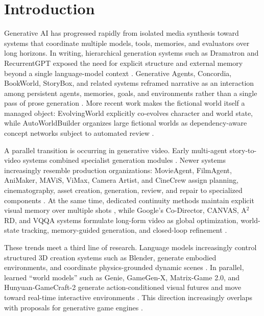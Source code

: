 \documentclass{article}
\begin{document}
\section{Introduction}

Generative AI has progressed rapidly from isolated media synthesis toward systems that coordinate multiple models, tools, memories, and evaluators over long horizons. In writing, hierarchical generation systems such as Dramatron and RecurrentGPT exposed the need for explicit structure and external memory beyond a single language-model context \citep{mirowski2022dramatron,zhou2023recurrentgpt}. Generative Agents, Concordia, BookWorld, StoryBox, and related systems reframed narrative as an interaction among persistent agents, memories, goals, and environments rather than a single pass of prose generation \citep{park2023generativeagents,vezhnevets2023concordia,ran2025bookworld,chen2026storybox}. More recent work makes the fictional world itself a managed object: EvolvingWorld explicitly co-evolves character and world state, while AutoWorldBuilder organizes large fictional worlds as dependency-aware concept networks subject to automated review \citep{zong2026evolvingworld,chen2026worldbuilding}.

A parallel transition is occurring in generative video. Early multi-agent story-to-video systems combined specialist generation modules \citep{wang2024aesopagent,yuan2024mora,hu2024storyagent}. Newer systems increasingly resemble production organizations: MovieAgent, FilmAgent, AniMaker, MAViS, ViMax, Camera Artist, and CineCrew assign planning, cinematography, asset creation, generation, review, and repair to specialized components \citep{wu2025movieagent,xu2025filmagent,shi2025animaker,wang2025mavis,huang2026vimax,hu2026cameraartist,chen2026cinecrew}. At the same time, dedicated continuity methods maintain explicit visual memory over multiple shots \citep{zhang2025storymem,an2025onestory,elmoghany2026infinitystory}, while Google's Co-Director, CANVAS, A$^2$RD, and VQQA systems formulate long-form video as global optimization, world-state tracking, memory-guided generation, and closed-loop refinement \citep{song2026codirector,mondal2026canvas,long2026a2rd,song2026vqqa}.

These trends meet a third line of research. Language models increasingly control structured 3D creation systems such as Blender, generate embodied environments, and coordinate physics-grounded dynamic scenes \citep{sun2023threedgpt,yang2023holodeck,liu2026simworlds}. In parallel, learned “world models” such as Genie, GameGen-X, Matrix-Game 2.0, and Hunyuan-GameCraft-2 generate action-conditioned visual futures and move toward real-time interactive environments \citep{bruce2024genie,che2024gamegenx,he2025matrixgame,tang2025hunyungamecraft2}. This direction increasingly overlaps with proposals for generative game engines \citep{yu2025generativegameengines,li2026pixelstostates}.
\end{document}
